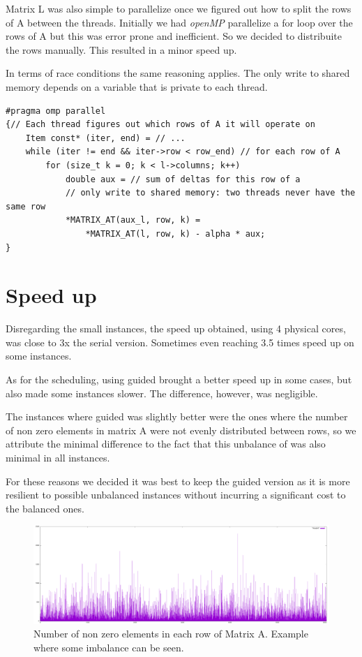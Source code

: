 \documentclass[a4paper]{article}
\begin{document}
Matrix L was also simple to parallelize once we figured out how to split the
rows of A between the threads. Initially we had \textit{openMP} parallelize a for loop
over the rows of A but this was error prone and inefficient. So we decided to
distribuite the rows manually. This resulted in a minor speed up.

In terms of race conditions the same reasoning applies. The only write to shared
memory depends on a variable that is private to each thread.

\begin{verbatim}
#pragma omp parallel
{// Each thread figures out which rows of A it will operate on
    Item const* (iter, end) = // ...
    while (iter != end && iter->row < row_end) // for each row of A
        for (size_t k = 0; k < l->columns; k++)
            double aux = // sum of deltas for this row of a
            // only write to shared memory: two threads never have the same row
            *MATRIX_AT(aux_l, row, k) =
                *MATRIX_AT(l, row, k) - alpha * aux;
}
\end{verbatim}

\section{Speed up}
Disregarding the small instances, the speed up obtained, using 4 physical cores,
was close to 3x the serial version. Sometimes even reaching 3.5 times speed up
on some instances.

As for the scheduling, using guided brought a better speed up in some cases, but
also made some instances slower. The difference, however, was negligible.

The instances where guided was slightly better were the ones where the number of
non zero elements in matrix A were not evenly distributed between rows, so we
attribute the minimal difference to the fact that this unbalance of was also
minimal in all instances.

For these reasons we decided it was best to keep the guided version as it is more
resilient to possible unbalanced instances without incurring a significant cost
to the balanced ones.

\begin{figure}[H]
    \centering
        \includegraphics[width=\textwidth]{./ML1M.png}
        \caption{Number of non zero elements in each row of Matrix A.
        Example where some imbalance can be seen.}
\end{figure}
\end{document}
